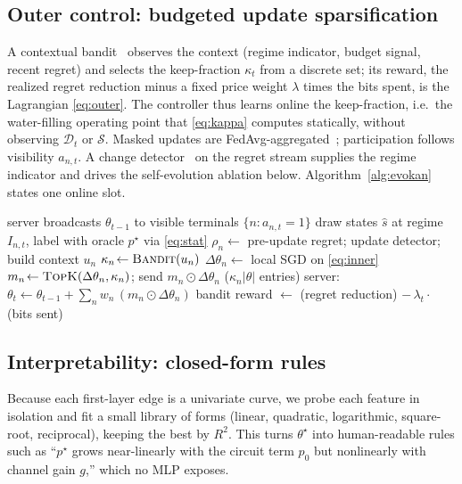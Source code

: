 \documentclass[journal]{IEEEtran}
\newcommand{\pstar}{p^{\star}}
\begin{document}
\subsection{Outer control: budgeted update sparsification}
A contextual bandit~\cite{li2010linucb,sutton2018rl} observes the context (regime
indicator, budget signal, recent regret) and selects the keep-fraction $\kappa_t$
from a discrete set; its reward, the realized regret reduction minus a fixed price
weight $\lambda$ times the bits spent, is the Lagrangian \eqref{eq:outer}. The
controller thus learns online the keep-fraction, i.e.\ the water-filling operating
point that \eqref{eq:kappa} computes statically, without observing $\mathcal D_t$ or
$\mathcal S$. Masked updates are
FedAvg-aggregated~\cite{mcmahan2017fedavg}; participation follows visibility
$a_{n,t}$. A change detector~\cite{page1954cusum} on the regret stream supplies the
regime indicator and drives the self-evolution ablation below.
Algorithm~\ref{alg:evokan} states one online slot.

\begin{algorithm}[t]
\caption{EvoKAN: one federated online slot $t$}
\label{alg:evokan}
\begin{algorithmic}[1]
\State server broadcasts $\theta_{t-1}$ to visible terminals $\{n:a_{n,t}=1\}$
  \State draw states $\hat s$ at regime $I_{n,t}$, label with oracle $\pstar$ via \eqref{eq:stat}
  \State $\rho_n\!\gets$ pre-update regret; update detector; build context $u_n$
  \State $\kappa_n\!\gets\textsc{Bandit}(u_n)$ 
  \State $\Delta\theta_n\!\gets$ local SGD on \eqref{eq:inner}
  \State $m_n\!\gets\textsc{TopK}(\Delta\theta_n,\kappa_n)$; send $m_n\!\odot\!\Delta\theta_n$ ($\kappa_n|\theta|$ entries)
\EndFor
\State server: $\theta_t\gets\theta_{t-1}+\sum_n w_n\,(m_n\!\odot\!\Delta\theta_n)$ 
\State bandit reward $\gets$ (regret reduction) $-\,\lambda_t\cdot$(bits sent)
\end{algorithmic}
\end{algorithm}

\subsection{Interpretability: closed-form rules}
Because each first-layer edge is a univariate curve, we probe each feature in
isolation and fit a small library of forms (linear, quadratic, logarithmic,
square-root, reciprocal), keeping the best by $R^2$. This turns $\theta^{\star}$
into human-readable rules such as ``$\pstar$ grows near-linearly with the circuit
term $p_0$ but nonlinearly with channel gain $g$,'' which no MLP exposes.
\end{document}
